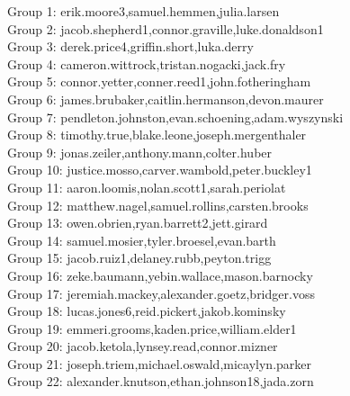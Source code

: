 \documentclass[10pt]{beamer}
\begin{document}
\begin{frame}
\footnotesize
Group 1: erik.moore3,samuel.hemmen,julia.larsen\\
Group 2: jacob.shepherd1,connor.graville,luke.donaldson1\\
Group 3: derek.price4,griffin.short,luka.derry\\
Group 4: cameron.wittrock,tristan.nogacki,jack.fry\\
Group 5: connor.yetter,conner.reed1,john.fotheringham\\
Group 6: james.brubaker,caitlin.hermanson,devon.maurer\\
Group 7: pendleton.johnston,evan.schoening,adam.wyszynski\\
Group 8: timothy.true,blake.leone,joseph.mergenthaler\\
Group 9: jonas.zeiler,anthony.mann,colter.huber\\
Group 10: justice.mosso,carver.wambold,peter.buckley1\\
Group 11: aaron.loomis,nolan.scott1,sarah.periolat\\
Group 12: matthew.nagel,samuel.rollins,carsten.brooks\\
Group 13: owen.obrien,ryan.barrett2,jett.girard\\
Group 14: samuel.mosier,tyler.broesel,evan.barth\\
Group 15: jacob.ruiz1,delaney.rubb,peyton.trigg\\
Group 16: zeke.baumann,yebin.wallace,mason.barnocky\\
Group 17: jeremiah.mackey,alexander.goetz,bridger.voss\\
Group 18: lucas.jones6,reid.pickert,jakob.kominsky\\
Group 19: emmeri.grooms,kaden.price,william.elder1\\
Group 20: jacob.ketola,lynsey.read,connor.mizner\\
Group 21: joseph.triem,michael.oswald,micaylyn.parker\\
Group 22: alexander.knutson,ethan.johnson18,jada.zorn\\
\end{frame}
\end{document}
